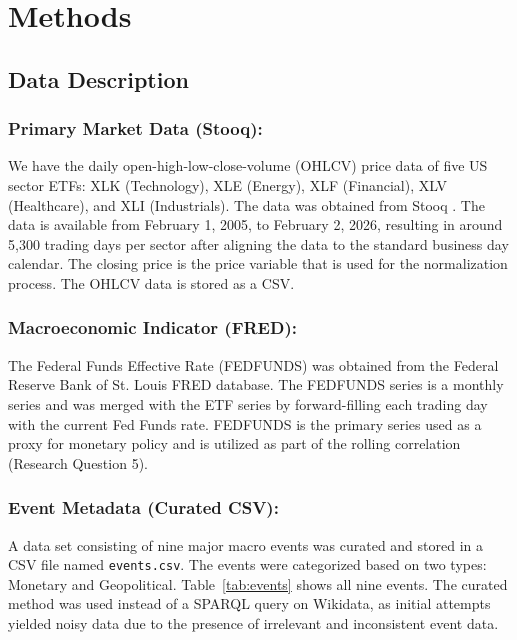\documentclass[12pt]{article}
\begin{document}
\section{Methods}

\subsection{Data Description}


\subsubsection{Primary Market Data (Stooq):} We have the daily open-high-low-close-volume (OHLCV) price data of five US sector ETFs: XLK (Technology), XLE (Energy), XLF (Financial), XLV (Healthcare), and XLI (Industrials). The data was obtained from Stooq \cite{stooq}. The data is available from February 1, 2005, to February 2, 2026, resulting in around 5,300 trading days per sector after aligning the data to the standard business day calendar. The closing price is the price variable that is used for the normalization process. The OHLCV data is stored as a CSV.


\subsubsection{Macroeconomic Indicator (FRED):} The Federal Funds Effective Rate (FEDFUNDS) was obtained from the Federal Reserve Bank of St. Louis FRED database. The FEDFUNDS series is a monthly series and was merged with the ETF series by forward-filling each trading day with the current Fed Funds rate. FEDFUNDS is the primary series used as a proxy for monetary policy and is utilized as part of the rolling correlation (Research Question 5).



\subsubsection{Event Metadata (Curated CSV):} A data set consisting of nine major macro events was curated and stored in a CSV file named \texttt{events.csv}. The events were categorized based on two types: Monetary and Geopolitical. Table~\ref{tab:events} shows all nine events. The curated method was used instead of a SPARQL query on Wikidata, as initial attempts yielded noisy data due to the presence of irrelevant and inconsistent event data.
\end{document}
